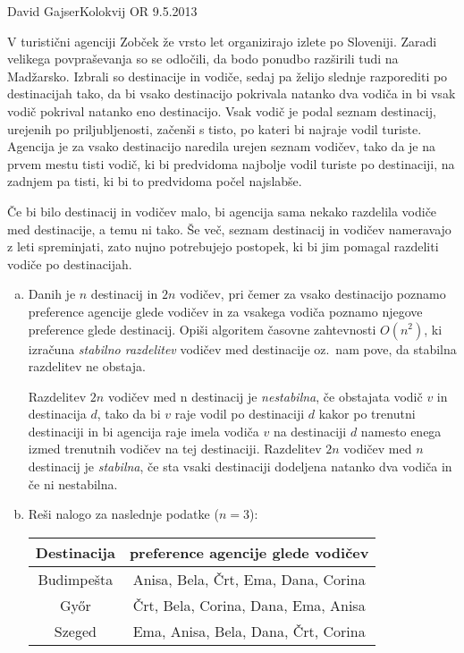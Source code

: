 \begin{naloga}{David Gajser}{Kolokvij OR 9.5.2013}
\begin{vprasanje}
V turistični agenciji Zobček že vrsto let organizirajo izlete po Sloveniji.
Zaradi velikega povpraševanja so se odločili,
da bodo ponudbo razširili tudi na Madžarsko.
Izbrali so destinacije in vodiče,
sedaj pa želijo slednje razporediti po destinacijah tako,
da bi vsako destinacijo pokrivala natanko dva vodiča
in bi vsak vodič pokrival natanko eno destinacijo.
Vsak vodič je podal seznam destinacij, urejenih po priljubljenosti,
začenši s tisto, po kateri bi najraje vodil turiste.
Agencija je za vsako destinacijo naredila urejen seznam vodičev,
tako da je na prvem mestu tisti vodič,
ki bi predvidoma najbolje vodil turiste po destinaciji,
na zadnjem pa tisti, ki bi to predvidoma počel najslabše.

Če bi bilo destinacij in vodičev malo,
bi agencija sama nekako razdelila vodiče med destinacije, a temu ni tako.
Še več, seznam destinacij in vodičev nameravajo z leti spreminjati,
zato nujno potrebujejo postopek,
ki bi jim pomagal razdeliti vodiče po destinacijah.

\begin{enumerate}[(a)]
\item Danih je $n$ destinacij in $2n$ vodičev,
pri čemer za vsako destinacijo poznamo preference agencije glede vodičev
in za vsakega vodiča poznamo njegove preference glede destinacij.
Opiši algoritem časovne zahtevnosti $O(n^2)$,
ki izračuna {\em stabilno razdelitev} vodičev med destinacije oz.~nam pove,
da stabilna razdelitev ne obstaja.

Razdelitev $2n$ vodičev med n destinacij je {\em nestabilna},
če obstajata vodič $v$ in destinacija $d$,
tako da bi $v$ raje vodil po destinaciji $d$ kakor po trenutni destinaciji
in bi agencija raje imela vodiča $v$ na destinaciji $d$
namesto enega izmed trenutnih vodičev na tej destinaciji.
Razdelitev $2n$ vodičev med $n$ destinacij je {\em stabilna},
če sta vsaki destinaciji dodeljena natanko dva vodiča in če ni nestabilna.

\item Reši nalogo za naslednje podatke ($n = 3$):
\begin{center}
\begin{tabular}{c|c}
Destinacija & preference agencije glede vodičev \\ \hline
Budimpešta  & Anisa, Bela, Črt, Ema, Dana, Corina \\
Győr        & Črt, Bela, Corina, Dana, Ema, Anisa \\
Szeged      & Ema, Anisa, Bela, Dana, Črt, Corina
\end{tabular}


\end{center}
\end{enumerate}
\end{vprasanje}
\end{naloga}
